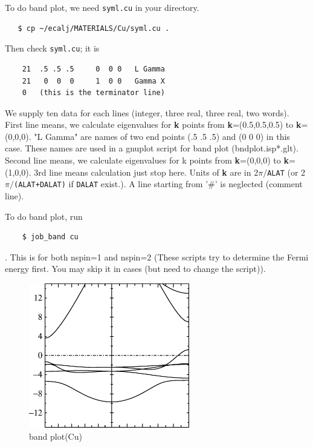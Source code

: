 To do band plot, we need \verb+syml.cu+ in your directory.
\begin{verbatim}
   $ cp ~/ecalj/MATERIALS/Cu/syml.cu .
\end{verbatim}
Then check \verb+syml.cu+; it is
\begin{verbatim}
    21  .5 .5 .5     0  0 0   L Gamma
    21   0  0  0     1  0 0   Gamma X
    0   (this is the terminator line)
\end{verbatim}
We supply ten data for each lines
(integer, three real, three real, two words).
First line means, we calculate eigenvalues 
for {\bf k} points from {\bf k}=(0.5,0.5,0.5) to {\bf k}=(0,0,0).
"L Gamma" are names of two end points 
(.5 .5 .5) and (0 0 0) in this case.
These names are used in a gnuplot script for band plot
(bndplot.isp*.glt).
Second line means, we calculate eigenvalues 
for k points from {\bf k}=(0,0,0) to {\bf k}=(1,0,0).
3rd line means calculation just stop here.
Units of {\bf k} are in 2$\pi/$\verb+ALAT+ (or 2$\pi/$\verb#(ALAT+DALAT)#
if \verb+DALAT+ exist.).
A line starting from '\#' is neglected (comment line).

To do band plot, run
\begin{verbatim}
    $ job_band cu
\end{verbatim}
. This is for both nspin=1 and nspin=2
(These scripts try to determine the Fermi energy first. You may skip it
in cases (but need to change the script)).

\begin{figure}[h]
 \begin{center}
  \includegraphics[width=70mm]{img/bandcu.eps}
  \caption{band plot(Cu)}
 \end{center}
\end{figure}

